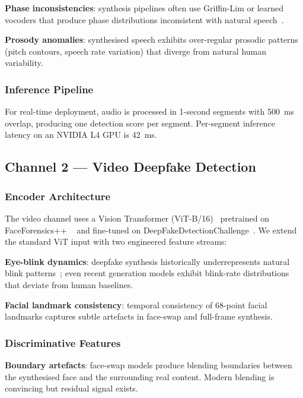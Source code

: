 \documentclass[sigconf,nonacm]{acmart}
\begin{document}
\textbf{Phase inconsistencies}: synthesis pipelines often use Griffin-Lim
or learned vocoders that produce phase distributions inconsistent with
natural speech~\cite{tak2024aasist}.

\textbf{Prosody anomalies}: synthesised speech exhibits over-regular
prosodic patterns (pitch contours, speech rate variation) that diverge
from natural human variability.

\subsubsection{Inference Pipeline}

For real-time deployment, audio is processed in 1-second segments with
500~ms overlap, producing one detection score per segment. Per-segment
inference latency on an NVIDIA L4 GPU is 42~ms.

\subsection{Channel 2 --- Video Deepfake Detection}

\subsubsection{Encoder Architecture}

The video channel uses a Vision Transformer
(ViT-B/16)~\cite{dosovitskiy2021vit} pretrained on FaceForensics++
~\cite{rossler2019faceforensics} and fine-tuned on
DeepFakeDetectionChallenge~\cite{dolhansky2024dfdc}. We extend the
standard ViT input with two engineered feature streams:

\textbf{Eye-blink dynamics}: deepfake synthesis historically
underrepresents natural blink patterns~\cite{li2018ictu}; even
recent generation models exhibit blink-rate distributions that
deviate from human baselines.

\textbf{Facial landmark consistency}: temporal consistency of 68-point
facial landmarks captures subtle artefacts in face-swap and full-frame
synthesis.

\subsubsection{Discriminative Features}

\textbf{Boundary artefacts}: face-swap models produce blending
boundaries between the synthesised face and the surrounding real
content. Modern blending is convincing but residual signal exists.
\end{document}
